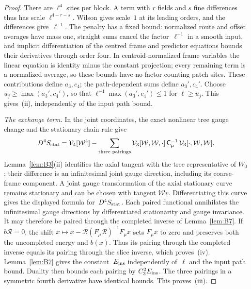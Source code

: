 \begin{proof}
There are $\ell^4$ sites per block. A term with $r$ fields and $s$ fine differences thus has scale $\ell^{4-r-s}$. Wilson gives scale~$1$ at its leading orders, and the differences give~$\ell^{-1}$. The penalty has a fixed bound: normalized route and offset averages have mass one, straight sums cancel the factor~$\ell^{-1}$ in a smooth input, and implicit differentiation of the centred frame and predictor equations bounds their derivatives through order four. In centroid-normalized frame variables the linear equation is identity minus the constant projection; every remaining term is a normalized average, so these bounds have no factor counting patch sites. These contributions define $a_3,c_4$; the path-dependent sums define $a_3',c_4'$. Choose $u_j\ge\max(a_3',c_4')$, so that $\ell^{-1}\max(a_3',c_4')\le1$ for $\ell\ge u_j$. This gives~(ii), independently of the input path bound.

\emph{The exchange term.} In the joint coordinates, the exact nonlinear tree gauge change and the stationary chain rule give
\begin{equation*}
D^4S_{\rm stat}=\mathcal V_4[\mathcal W^4]
 -\sum_{\text{three pairings}}\mathcal V_3[\mathcal W,\mathcal W,\cdot]\,
 \mathsf C_\mu^{-1}\,\mathcal V_3[\cdot,\mathcal W,\mathcal W].
\end{equation*}
Lemma~\ref{lem:B3}(ii) identifies the axial tangent with the tree representative of $W_0$: their difference is an infinitesimal joint gauge direction, including its coarse-frame component. A joint gauge transformation of the axial stationary curve remains stationary and can be chosen with tangent $\mathcal Wv$. Differentiating this curve gives the displayed formula for~$D^4S_{\rm stat}$. Each paired functional annihilates the infinitesimal gauge directions by differentiated stationarity and gauge invariance. It may therefore be paired through the completed inverse of Lemma~\ref{lem:B7}. If $b\mathcal R=0$, the shift $x\mapsto x-\mathcal R(F_\mu\mathcal R)^{-1}F_\mu x$ sets $F_\mu x$ to zero and preserves both the uncompleted energy and $b(x)$. Thus its pairing through the completed inverse equals its pairing through the slice inverse, which proves~(iv). Lemma~\ref{lem:B7} gives the constant~$E_{\rm ins}$ independently of~$\ell$ and the input path bound. Duality then bounds each pairing by $C_3^2E_{\rm ins}$. The three pairings in a symmetric fourth derivative have identical bounds. This proves~(iii).
\end{proof}

